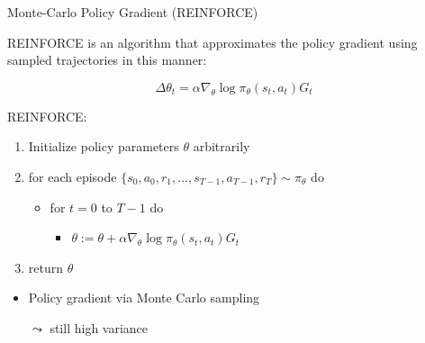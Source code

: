 \documentclass[aspectratio=169]{../latex_main/tntbeamer}  %
\begin{document}
\begin{frame}[c]{Monte-Carlo Policy Gradient (REINFORCE)}
	
REINFORCE is an algorithm that approximates the policy gradient using sampled trajectories in this manner:

$$ \Delta \theta_t = \alpha \nabla_\theta \log \pi_\theta (s_t, a_t) G_t $$
	
	
REINFORCE:
\begin{enumerate}
	\item Initialize policy parameters $\theta$ arbitrarily
	\item for each episode $\{s_0, a_0, r_1, \ldots, s_{T-1}, a_{T-1}, r_T \} \sim \pi_\theta $ do
	\begin{itemize}
		\item for $t=0$ to $T - 1$ do
		\begin{itemize}
			\item $\theta := \theta + \alpha \nabla_\theta \log \pi_\theta (s_t, a_t) G_t $
		\end{itemize}
	\end{itemize}
	\item return $\theta$
\end{enumerate}

\begin{itemize}
    \item Policy gradient via Monte Carlo sampling
    \item[$\leadsto$] still high variance
\end{itemize}
	
\end{frame}
\end{document}
